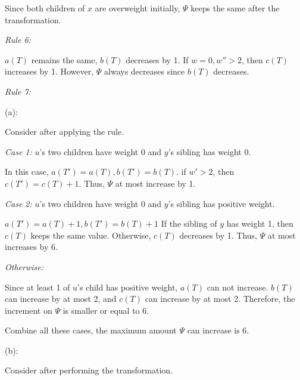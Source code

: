 \documentclass[10pt]{article}
\begin{document}
\begin{enumerate}
\begin{enumerate}
\begin{addmargin}[1em]{0em}
					Since both children of $x$ are overweight initially, $\Psi$
					keeps the same after the transformation. 
				\end{addmargin}
				\textit{Rule 6:}
				\begin{addmargin}[1em]{0em}
					$a(T)$ remains the same, $b(T)$ decreases by 1.
					If $w = 0, w'' > 2$, then $c(T)$ increases by 1.
					However, $\Psi$ always decreases since $b(T)$ decreases.
				\end{addmargin}
				\textit{Rule 7:}
				\begin{addmargin}[1em]{0em}
					(a):
					\begin{addmargin}[1em]{0em}
						Consider after applying the rule.

						\textit{Case 1:} $u$'s two children have weight 0 and
						$y$'s sibling has weight 0.
						\begin{addmargin}[1em]{0em}
							In this case, $a(T') = a(T), b(T') = b(T)$.
							if $w' > 2$, then $c(T') = c(T)+1$.
							Thus, $\Psi$ at most increase by 1.
						\end{addmargin}
						\textit{Case 2:} $u$'s two children have weight 0 and
						$y$'s sibling has positive weight.
						\begin{addmargin}[1em]{0em}
							$a(T') = a(T)+1, b(T') = b(T)+1$
							If the sibling of $y$ has weight 1, then $c(T)$
							keeps the same value.
							Otherwise, $c(T)$ decreases by 1.
							Thus, $\Psi$ at most increases by 6.
						\end{addmargin}
						\textit{Otherwise:}
						\begin{addmargin}[1em]{0em}
							Since at least 1 of $u$'s child has positive
							weight, $a(T)$ can not increase.
							$b(T)$ can increase by at most 2, and $c(T)$ can
							increase by at most 2.
							Therefore, the increment on $\Psi$ is smaller or
							equal to 6.
						\end{addmargin}
						Combine all these cases, the maximum amount $\Psi$ can
						increase is 6.
					\end{addmargin}
					(b):
					\begin{addmargin}[1em]{0em}
						Consider after performing the transformation.


\end{addmargin}
\end{addmargin}
\end{enumerate}
\end{enumerate}
\end{document}
